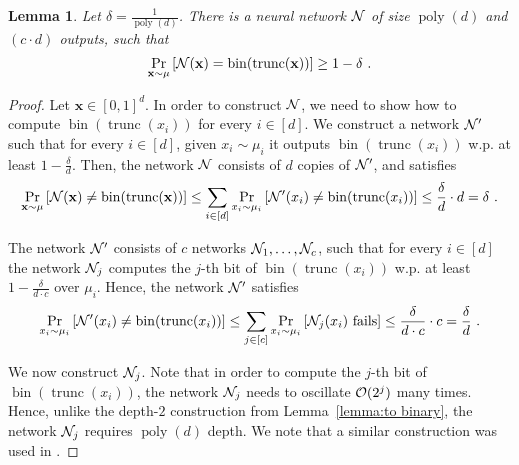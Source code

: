 \documentclass[11pt]{article}
\newtheorem{lemma}{Lemma}[section]
\newcommand{\bx}{\mathbf{x}}
\newcommand{\co}{{\cal O}}
\newcommand{\cn}{{\cal N}}
\DeclareMathOperator{\poly}{poly}
\DeclareMathOperator{\bin}{bin}
\DeclareMathOperator{\trunc}{trunc}
\begin{document}
\begin{lemma}
	\label{lemma:to binary exponential}
	Let $\delta = \frac{1}{\poly(d)}$.
	There is a neural network $\cn$ of size $\poly(d)$ and $(c \cdot d)$ outputs, such that 
	\[
	\Pr_{\bx \sim \mu}\left[ \cn(\bx) = \bin(\trunc(\bx)) \right] \geq 1 - \delta~.
	\] 
\end{lemma}
\begin{proof}
	Let $\bx \in [0,1]^d$. In order to construct $\cn$, we need to show how to compute $\bin(\trunc(x_i))$ for every $i \in [d]$. We construct a network $\cn'$ such that for every $i \in [d]$, given $x_i \sim \mu_i$ it outputs $\bin(\trunc(x_i))$ w.p. at least $1-\frac{\delta}{d}$.
	Then, the network $\cn$ consists of $d$ copies of $\cn'$, and satisfies
	\[
	\Pr_{\bx \sim \mu}\left[\cn(\bx) \neq \bin(\trunc(\bx))\right]
	\leq \sum_{i \in [d]} \Pr_{x_i \sim \mu_i}\left[\cn'(x_i) \neq \bin(\trunc(x_i))\right]
	\leq \frac{\delta}{d} \cdot d = \delta~.
	\]
	
	The network $\cn'$ consists of $c$ networks $\cn_1,\ldots,\cn_c$, such that for every $i \in [d]$ the network $\cn_j$ computes the $j$-th bit of $\bin(\trunc(x_i))$ w.p. at least $1-\frac{\delta}{d \cdot c}$ over $\mu_i$. Hence, the network $\cn'$ satisfies 
	\[
	\Pr_{x_i \sim \mu_i}\left[\cn'(x_i) \neq \bin(\trunc(x_i))\right]
	\leq \sum_{j \in [c]} \Pr_{x_i \sim \mu_i}\left[\cn_j(x_i) \text{ fails}\right]
	\leq \frac{\delta}{d \cdot c} \cdot c = \frac{\delta}{d}~.
	\]
	
	We now construct $\cn_j$. Note that in order to compute the $j$-th bit of $\bin(\trunc(x_i))$, the network $\cn_j$ needs to oscillate $\co(2^j)$ many times. 
	Hence, unlike the depth-$2$ construction from Lemma~\ref{lemma:to binary}, the network $\cn_j$ requires $\poly(d)$ depth.
	We note that a similar construction was used in \cite{safran2017depth}.
	

\end{proof}
\end{document}

